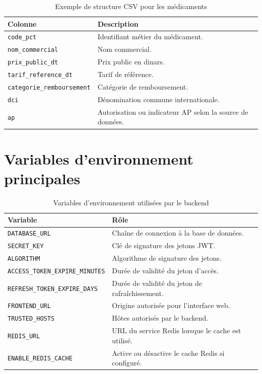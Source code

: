 \begin{table}[H]
    \centering
    \caption{Exemple de structure CSV pour les médicaments}
    \begin{tabular}{L{5.2cm}L{7.8cm}}
        \toprule
        \textbf{Colonne} & \textbf{Description} \\
        \midrule
        \texttt{code\_pct} & Identifiant métier du médicament. \\
        \texttt{nom\_commercial} & Nom commercial. \\
        \texttt{prix\_public\_dt} & Prix public en dinars. \\
        \texttt{tarif\_reference\_dt} & Tarif de référence. \\
        \texttt{categorie\_remboursement} & Catégorie de remboursement. \\
        \texttt{dci} & Dénomination commune internationale. \\
        \texttt{ap} & Autorisation ou indicateur AP selon la source de données. \\
        \bottomrule
    \end{tabular}
\end{table}

\section{Variables d'environnement principales}

\begin{table}[H]
    \centering
    \caption{Variables d'environnement utilisées par le backend}
    \begin{tabular}{L{6.2cm}L{6.8cm}}
        \toprule
        \textbf{Variable} & \textbf{Rôle} \\
        \midrule
        \texttt{DATABASE\_URL} & Chaîne de connexion à la base de données. \\
        \texttt{SECRET\_KEY} & Clé de signature des jetons JWT. \\
        \texttt{ALGORITHM} & Algorithme de signature des jetons. \\
        \texttt{ACCESS\_TOKEN\_EXPIRE\_MINUTES} & Durée de validité du jeton d'accès. \\
        \texttt{REFRESH\_TOKEN\_EXPIRE\_DAYS} & Durée de validité du jeton de rafraîchissement. \\
        \texttt{FRONTEND\_URL} & Origine autorisée pour l'interface web. \\
        \texttt{TRUSTED\_HOSTS} & Hôtes autorisés par le backend. \\
        \texttt{REDIS\_URL} & URL du service Redis lorsque le cache est utilisé. \\
        \texttt{ENABLE\_REDIS\_CACHE} & Active ou désactive le cache Redis si configuré. \\
        \bottomrule
    \end{tabular}
\end{table}

